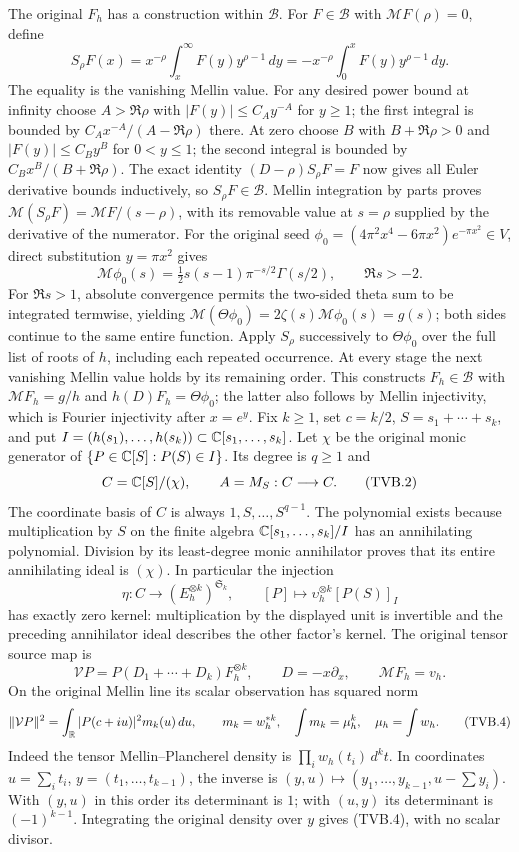The original $F_h$ has a construction within $\mathscr B$.
For $F\in\mathscr B$ with $\mathcal MF(\rho)=0$, define
\[
 S_\rho F(x)=x^{-\rho}\int_x^\infty F(y)y^{\rho-1}\,dy
           =-x^{-\rho}\int_0^x F(y)y^{\rho-1}\,dy.
\]
The equality is the vanishing Mellin value. For any desired
power bound at infinity choose $A>\Re\rho$ with
$|F(y)|\le C_Ay^{-A}$ for $y\ge1$; the first integral is bounded
by $C_Ax^{-A}/(A-\Re\rho)$ there. At zero choose $B$ with
$B+\Re\rho>0$ and $|F(y)|\le C_By^B$ for $0<y\le1$;
the second integral is bounded by $C_Bx^B/(B+\Re\rho)$.
The exact identity $(D-\rho)S_\rho F=F$ now gives all Euler
derivative bounds inductively, so $S_\rho F\in\mathscr B$.
Mellin integration by parts proves
$\mathcal M(S_\rho F)=\mathcal MF/(s-\rho)$, with its removable
value at $s=\rho$ supplied by the derivative of the numerator.
For the original seed
$\phi_0=(4\pi^2x^4-6\pi x^2)e^{-\pi x^2}\in V$,
direct substitution $y=\pi x^2$ gives
\[
 \mathcal M\phi_0(s)=\tfrac12s(s-1)\pi^{-s/2}\Gamma(s/2),
 \qquad \Re s>-2.
\]
For $\Re s>1$, absolute convergence permits the two-sided theta
sum to be integrated termwise, yielding
$\mathcal M(\Theta\phi_0)=2\zeta(s)\mathcal M\phi_0(s)=g(s)$;
both sides continue to the same entire function. Apply $S_\rho$
successively to $\Theta\phi_0$ over the full list of roots of $h$,
including each repeated occurrence. At every stage the next
vanishing Mellin value holds by its remaining order. This constructs
$F_h\in\mathscr B$ with $\mathcal MF_h=g/h$ and
$h(D)F_h=\Theta\phi_0$; the latter also follows by Mellin
injectivity, which is Fourier injectivity after $x=e^y$.
Fix $k\ge1$, set $c=k/2$, $S=s_1+\cdots+s_k$, and put
$I=(h(s_1),\ldots,h(s_k))\subset\mathbb{C}[s_1,\ldots,s_k]$.
Let $\chi$ be the original monic generator of
$\{P\in\mathbb{C}[S]:P(S)\in I\}$. Its degree is $q\ge1$ and
\[
 C=\mathbb{C}[S]/(\chi),\qquad A=M_S:C\longrightarrow C.
 \tag{TVB.2}
\]
The coordinate basis of $C$ is always $1,S,\ldots,S^{q-1}$.
The polynomial exists because multiplication by $S$ on the finite
algebra $\mathbb{C}[s_1,\ldots,s_k]/I$ has an annihilating polynomial.
Division by its least-degree monic annihilator proves that its entire
annihilating ideal is $(\chi)$. In particular the injection
\[
 \eta:C\longrightarrow(E_h^{\otimes k})^{\mathfrak S_k},\qquad
 [P]\longmapsto\upsilon_h^{\otimes k}[P(S)]_I
 \tag{TVB.3}
\]
has exactly zero kernel: multiplication by the displayed unit is
invertible and the preceding annihilator ideal describes the other
factor's kernel. The original tensor source map is
\[
 \mathcal V P=P(D_1+\cdots+D_k)F_h^{\otimes k},\qquad
 D=-x\partial_x,\qquad \mathcal MF_h=v_h.
\]
On the original Mellin line its scalar observation has squared norm
\[
 \|\mathcal VP\|^2=\int_{\mathbb{R}} |P(c+iu)|^2m_k(u)\,du,
 \qquad m_k=w_h^{*k},\quad
 \int m_k=\mu_h^k,\quad\mu_h=\int w_h.
 \tag{TVB.4}
\]
Indeed the tensor Mellin--Plancherel density is
$\prod_iw_h(t_i)\,d^kt$. In coordinates
$u=\sum_i t_i$, $y=(t_1,\ldots,t_{k-1})$, the inverse is
$(y,u)\mapsto(y_1,\ldots,y_{k-1},u-\sum y_i)$.
With $(y,u)$ in this order its determinant is $1$; with $(u,y)$
its determinant is $(-1)^{k-1}$. Integrating the original density
over $y$ gives (TVB.4), with no scalar divisor.

